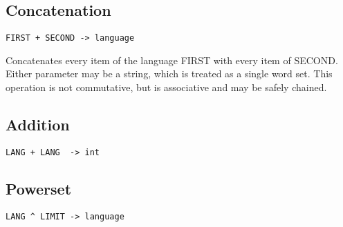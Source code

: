 \subsection{Concatenation}
\begin{center}
\begin{minipage}{5cm}
\begin{verbatim}
FIRST + SECOND -> language
\end{verbatim}
\end{minipage}
\end{center}
\begin{normalsize}
Concatenates every item of the language FIRST with every item of SECOND. Either parameter may be a string, which is treated as a single word set. This operation is not commutative, but is associative and may be safely chained.
\end{normalsize}

\subsection{Addition}
\begin{center}
\begin{minipage}{5cm}
\begin{verbatim}
LANG + LANG  -> int
\end{verbatim}
\end{minipage}
\end{center}
\begin{normalsize}

\end{normalsize}

\subsection{Powerset}
\begin{center}
\begin{minipage}{5cm}
\begin{verbatim}
LANG ^ LIMIT -> language
\end{verbatim}
\end{minipage}
\end{center}
\begin{normalsize}

\end{normalsize}


